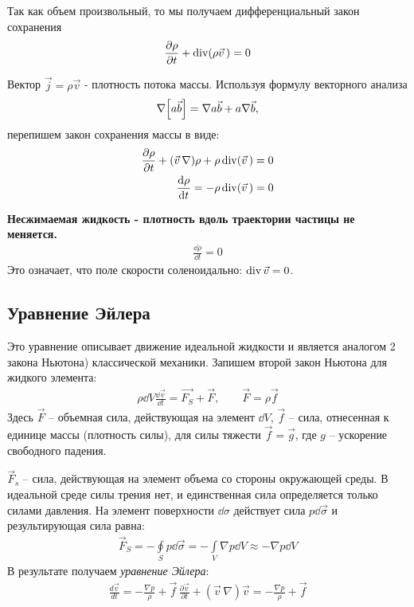 Так как объем произвольный, то мы получаем дифференциальный закон сохранения
\begin{align*} 
\frac{\partial \rho}{\partial t}+\operatorname{div}(\rho \vec{v}\,)=0
\end{align*}

Вектор $ \vec{j}=\rho \vec{v} $ - плотность потока массы. Используя формулу векторного анализа
\begin{equation}
	\nabla\qty[a \vec{b}]=\nabla a \vec{b}+a \nabla \vec{b},
\end{equation}
перепишем закон сохранения массы в виде:
\begin{align*} 
\frac{\partial \rho}{\partial t}+(\vec{v}\,\nabla) \rho+\rho \operatorname{div}(\vec{v}\,)=0 \\
\frac{\dd \rho}{\dd t}=-\rho \operatorname{div}(\vec{v}\,)=0
\end{align*}

\textbf{Несжимаемая жидкость - плотность вдоль траектории частицы не меняется.}
\begin{align*} 
\frac{\dd \rho}{\dd t}=0
\end{align*}
Это означает, что поле скорости соленоидально: $\operatorname{div}\vec{v}=0$.

\subsection{Уравнение Эйлера}
Это уравнение описывает движение идеальной жидкости и является аналогом {2 закона Ньютона}) классической механики. Запишем второй закон Ньютона для жидкого элемента:
\begin{align*}
\rho\dd{V} \frac{\dd \vec{v}}{\dd t} =\vec{F_{S}}+\vec{F}, \qquad
\vec { F } = \rho \vec { f }
\end{align*}
Здесь $\vec{F}$ --  объемная сила, действующая на элемент $\dd V$, $\vec{f}$ -- сила, отнесенная к единице массы (плотность силы), для силы тяжести $\vec{f}=\vec{g}$, где $g$ -- ускорение свободного падения.

$\vec{F}_s$ -- сила, действующая на элемент объема со стороны окружающей среды.  В идеальной среде силы трения нет, и единственная сила определяется только силами давления. На элемент поверхности $\dd\sigma$ действует сила $ p \dd{\vec{\sigma}} $ и результирующая сила равна:
\begin{align*}
\vec { F } _ { S } = - \oint \limits_ { S } p \dd{\vec{\sigma}} = - \int \limits_ { V } \nabla p\dd{V} \approx - \nabla p\dd{V}
\end{align*}
В результате получаем \textit{уравнение Эйлера}:
\begin{align*}
\frac { d \vec { v } } { d t } = - \frac { \nabla p } { \rho } + \vec { f }\,
\frac { \partial \vec { v } } { \partial t } + ( \vec{v}\,\nabla ) \vec { v } = - \frac { \nabla p } { \rho } + \vec { f }
\end{align*}

